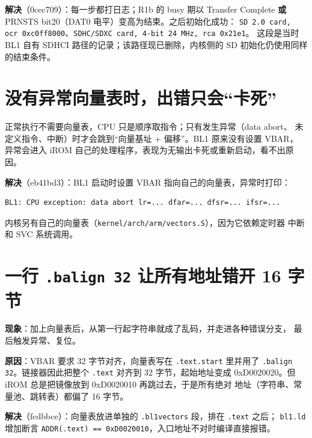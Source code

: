 \textbf{解决}（0cec709）：每一步都打日志；R1b 的 busy 期以 Transfer
Complete \textbf{或} PRNSTS bit20（DAT0
电平）变高为结束。之后初始化成功：
\passthrough{\lstinline!SD 2.0 card, ocr 0xc0ff8000!}、\passthrough{\lstinline!SDHC/SDXC card, 4-bit 24 MHz, rca 0x21e1!}。
这段是当时 BL1 自有 SDHCI 路径的记录；该路径现已删除，内核侧的 SD
初始化仍使用同样的结束条件。

\section{没有异常向量表时，出错只会``卡死''}\label{ux6ca1ux6709ux5f02ux5e38ux5411ux91cfux8868ux65f6ux51faux9519ux53eaux4f1aux5361ux6b7b}

正常执行不需要向量表，CPU 只是顺序取指令；只有发生异常（data abort、
未定义指令、中断）时才会跳到``向量基址 + 偏移''。BL1 原来没有设置 VBAR，
异常会进入 iROM 自己的处理程序，表现为无输出卡死或重新启动，看不出原因。

\textbf{解决}（eb41bd3）：BL1 启动时设置 VBAR
指向自己的向量表，异常时打印：

\begin{lstlisting}
BL1: CPU exception: data abort lr=... dfar=... dfsr=... ifsr=...
\end{lstlisting}

内核另有自己的向量表（\passthrough{\lstinline!kernel/arch/arm/vectors.S!}），因为它依赖定时器
中断和 SVC 系统调用。

\section{\texorpdfstring{一行 \texttt{.balign\ 32} 让所有地址错开 16
字节}{一行 .balign 32 让所有地址错开 16 字节}}\label{ux4e00ux884c-balign-32-ux8ba9ux6240ux6709ux5730ux5740ux9519ux5f00-16-ux5b57ux8282}

\textbf{现象}：加上向量表后，从第一行起字符串就成了乱码，并走进各种错误分支，
最后触发异常、复位。

\textbf{原因}：VBAR 要求 32 字节对齐，向量表写在
\passthrough{\lstinline!.text.start!} 里并用了
\passthrough{\lstinline!.balign 32!}。链接器因此把整个
\passthrough{\lstinline!.text!} 对齐到 32 字节，起始地址变成
0xD0020020。但 iROM 总是把镜像放到 0xD0020010 再跳过去，于是所有绝对
地址（字符串、常量池、跳转表）都偏了 16 字节。

\textbf{解决}（fcdbbce）：向量表放进单独的
\passthrough{\lstinline!.bl1vectors!} 段，排在
\passthrough{\lstinline!.text!} 之后； \passthrough{\lstinline!bl1.ld!}
增加断言
\passthrough{\lstinline!ADDR(.text) == 0xD0020010!}，入口地址不对时编译直接报错。

